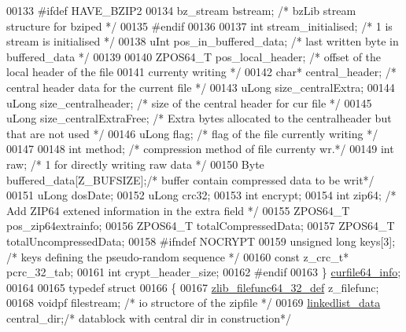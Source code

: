 \begin{DoxyCode}
00133 \textcolor{preprocessor}{#ifdef HAVE\_BZIP2}
00134     bz\_stream bstream;          \textcolor{comment}{/* bzLib stream structure for bziped */}
00135 \textcolor{preprocessor}{#endif}
00136 
00137     \textcolor{keywordtype}{int}  stream\_initialised;    \textcolor{comment}{/* 1 is stream is initialised */}
00138     uInt pos\_in\_buffered\_data;  \textcolor{comment}{/* last written byte in buffered\_data */}
00139 
00140     ZPOS64\_T pos\_local\_header;     \textcolor{comment}{/* offset of the local header of the file}
00141 \textcolor{comment}{                                     currenty writing */}
00142     \textcolor{keywordtype}{char}* central\_header;       \textcolor{comment}{/* central header data for the current file */}
00143     uLong size\_centralExtra;
00144     uLong size\_centralheader;   \textcolor{comment}{/* size of the central header for cur file */}
00145     uLong size\_centralExtraFree; \textcolor{comment}{/* Extra bytes allocated to the centralheader but that are not used */}
00146     uLong flag;                 \textcolor{comment}{/* flag of the file currently writing */}
00147 
00148     \textcolor{keywordtype}{int}  method;                \textcolor{comment}{/* compression method of file currenty wr.*/}
00149     \textcolor{keywordtype}{int}  raw;                   \textcolor{comment}{/* 1 for directly writing raw data */}
00150     Byte buffered\_data[Z\_BUFSIZE];\textcolor{comment}{/* buffer contain compressed data to be writ*/}
00151     uLong dosDate;
00152     uLong crc32;
00153     \textcolor{keywordtype}{int}  encrypt;
00154     \textcolor{keywordtype}{int}  zip64;               \textcolor{comment}{/* Add ZIP64 extened information in the extra field */}
00155     ZPOS64\_T pos\_zip64extrainfo;
00156     ZPOS64\_T totalCompressedData;
00157     ZPOS64\_T totalUncompressedData;
00158 \textcolor{preprocessor}{#ifndef NOCRYPT}
00159     \textcolor{keywordtype}{unsigned} \textcolor{keywordtype}{long} keys[3];     \textcolor{comment}{/* keys defining the pseudo-random sequence */}
00160     \textcolor{keyword}{const} z\_crc\_t* pcrc\_32\_tab;
00161     \textcolor{keywordtype}{int} crypt\_header\_size;
00162 \textcolor{preprocessor}{#endif}
00163 \} \hyperlink{structcurfile64__info}{curfile64\_info};
00164 
00165 \textcolor{keyword}{typedef} \textcolor{keyword}{struct}
00166 \{
00167     \hyperlink{structzlib__filefunc64__32__def__s}{zlib\_filefunc64\_32\_def} z\_filefunc;
00168     voidpf filestream;        \textcolor{comment}{/* io structore of the zipfile */}
00169     \hyperlink{structlinkedlist__data__s}{linkedlist\_data} central\_dir;\textcolor{comment}{/* datablock with central dir in construction*/}

\end{DoxyCode}
